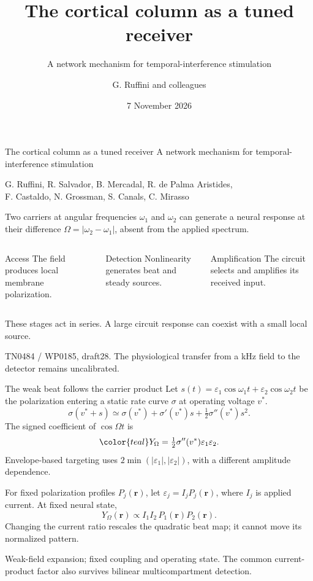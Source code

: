 \documentclass[aspectratio=169,11pt]{beamer}
\title{The cortical column as a tuned receiver}
\subtitle{A network mechanism for temporal-interference stimulation}
\author{G. Ruffini and colleagues}
\date{7 November 2026}
\newcommand{\source}[1]{\vfill{\color{muted}\fontsize{6.5}{8}\selectfont #1\par}}
\newcommand{\smalltext}{\fontsize{9}{11}\selectfont}
\newcommand{\eps}{\varepsilon}
\begin{document}
\begin{frame}[t]
{The cortical column as a tuned receiver}
\vspace{0mm}
{\color{teal}\large A network mechanism for temporal-interference stimulation}

\vspace{2mm}
{\smalltext G. Ruffini, R. Salvador, B. Mercadal, R. de Palma Aristides,\\
F. Castaldo, N. Grossman, S. Canals, C. Mirasso}

\vspace{1mm}
Two carriers at angular frequencies $\omega_1$ and $\omega_2$ can generate a
neural response at their difference $\Omega=|\omega_2-\omega_1|$, absent from the applied spectrum.

\begin{columns}[T,onlytextwidth]
\begin{block}{Access}
The field produces local membrane polarization.
\end{block}
\begin{block}{Detection}
Nonlinearity generates beat and steady sources.
\end{block}
\begin{block}{Amplification}
The circuit selects and amplifies its received input.
\end{block}
\end{columns}

\vspace{2mm}
These stages act in series. A large circuit response can coexist with a small local source.
\source{TN0484 / WP0185, draft28. The physiological transfer from a kHz field to the detector remains uncalibrated.}
\end{frame}

\begin{frame}[t]{The weak beat follows the carrier product}
Let $s(t)=\eps_1\cos\omega_1t+\eps_2\cos\omega_2t$ be the polarization entering
a static rate curve $\sigma$ at operating voltage $v^*$.
\[
\sigma(v^*+s)\simeq\sigma(v^*)+\sigma'(v^*)s+\tfrac12\sigma''(v^*)s^2.
\]
The signed coefficient of $\cos\Omega t$ is
\[
\color{teal}Y_\Omega=\tfrac12\sigma''(v^*)\eps_1\eps_2.
\]
Envelope-based targeting uses $2\min(|\eps_1|,|\eps_2|)$, with a different amplitude dependence.

\vspace{2mm}
For fixed polarization profiles $P_j(\mathbf r)$, let
$\eps_j=I_jP_j(\mathbf r)$, where $I_j$ is applied current. At fixed neural state,
\[
Y_\Omega(\mathbf r)\propto I_1I_2\,P_1(\mathbf r)P_2(\mathbf r).
\]
Changing the current ratio rescales the quadratic beat map; it cannot move its normalized pattern.
\source{Weak-field expansion; fixed coupling and operating state. The common current-product factor also survives bilinear multicompartment detection.}
\end{frame}
\end{document}
